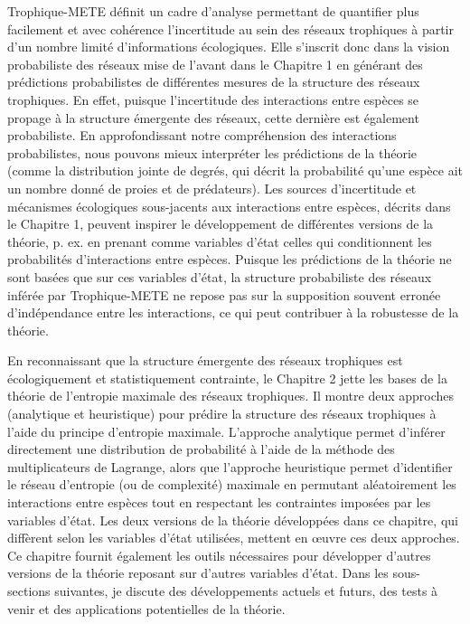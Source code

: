 Trophique-METE définit un cadre d'analyse permettant de quantifier plus
facilement et avec cohérence l'incertitude au sein des réseaux trophiques à
partir d'un nombre limité d'informations écologiques. Elle s'inscrit donc dans
la vision probabiliste des réseaux mise de l'avant dans le Chapitre 1 en
générant des prédictions probabilistes de différentes mesures de la structure
des réseaux trophiques. En effet, puisque l'incertitude des interactions entre
espèces se propage à la structure émergente des réseaux, cette dernière est
également probabiliste. En approfondissant notre compréhension des interactions
probabilistes, nous pouvons mieux interpréter les prédictions de la théorie
(comme la distribution jointe de degrés, qui décrit la probabilité qu'une espèce
ait un nombre donné de proies et de prédateurs). Les sources d'incertitude et
mécanismes écologiques sous-jacents aux interactions entre espèces, décrits dans
le Chapitre 1, peuvent inspirer le développement de différentes versions de la
théorie, p. ex. en prenant comme variables d'état celles qui conditionnent les
probabilités d'interactions entre espèces. Puisque les prédictions de la théorie
ne sont basées que sur ces variables d'état, la structure probabiliste des
réseaux inférée par Trophique-METE ne repose pas sur la supposition souvent
erronée d'indépendance entre les interactions, ce qui peut contribuer à la
robustesse de la théorie.

En reconnaissant que la structure émergente des réseaux trophiques est
écologiquement et statistiquement contrainte, le Chapitre 2 jette les bases de
la théorie de l'entropie maximale des réseaux trophiques. Il montre deux
approches (analytique et heuristique) pour prédire la structure des réseaux
trophiques à l'aide du principe d'entropie maximale. L'approche analytique
permet d'inférer directement une distribution de probabilité à l'aide de la
méthode des multiplicateurs de Lagrange, alors que l'approche heuristique permet
d'identifier le réseau d'entropie (ou de complexité) maximale en permutant
aléatoirement les interactions entre espèces tout en respectant les contraintes
imposées par les variables d'état. Les deux versions de la théorie développées
dans ce chapitre, qui diffèrent selon les variables d'état utilisées, mettent en
œuvre ces deux approches. Ce chapitre fournit également les outils nécessaires
pour développer d'autres versions de la théorie reposant sur d'autres variables
d'état. Dans les sous-sections suivantes, je discute des développements actuels
et futurs, des tests à venir et des applications potentielles de la théorie. 

